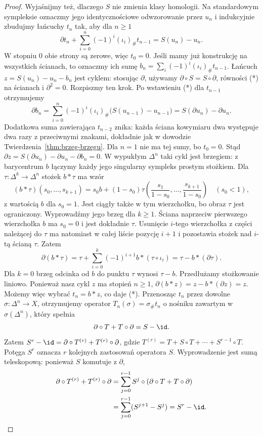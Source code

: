 \begin{proof}
Wyjaśnijmy też, dlaczego $S$ nie zmienia
klasy homologii. Na standardowym sympleksie
oznaczmy jego identycznościowe odwzorowanie
przez $u_n$ i indukcyjnie zbudujmy
łańcuchy $t_n$ tak, aby dla $n\geq1$
\[
 \partial t_n+\sum_{i=0}^n(-1)^i(\iota_i)_\#t_{n-1}
       =S(u_n)-u_n. \tag{*}
\]
W stopniu $0$ obie strony są zerowe,
więc $t_0=0$. Jeśli mamy już konstrukcję
na wszystkich ścianach, to oznaczmy ich sumę
$b_n=\sum_i(-1)^i(\iota_i)_\#t_{n-1}$.
Łańcuch $z=S(u_n)-u_n-b_n$
jest cyklem: stosując $\partial$,
używamy $\partial\circ S=S\circ\partial$,
równości (*) na ścianach
i $\partial^2=0$.
Rozpiszmy ten krok. Po wstawieniu (*) dla $t_{n-1}$
otrzymujemy
\[
 \partial b_n
 =\sum_{i=0}^n(-1)^i(\iota_i)_\#
       \bigl(S(u_{n-1})-u_{n-1}\bigr)
 =S(\partial u_n)-\partial u_n.
\]
Dodatkowa suma zawierająca $t_{n-2}$ znika:
każda ściana kowymiaru dwa występuje dwa razy
z przeciwnymi znakami, dokładnie jak w dowodzie
Twierdzenia~\ref{thm:brzeg-brzegu}. Dla $n=1$ nie ma tej sumy,
bo $t_0=0$. Stąd
$\partial z=S(\partial u_n)-\partial u_n-\partial b_n=0$.
W wypukłym $\Delta^n$ taki cykl jest
brzegiem: z barycentrum $b$ łączymy
każdy jego singularny sympleks prostym
stożkiem. Dla $\tau:\Delta^k\to\Delta^n$ stożek $b*\tau$
ma wzór
\[
 (b*\tau)(s_0,\ldots,s_{k+1})
 =s_0b+(1-s_0)\tau\left(\frac{s_1}{1-s_0},\ldots,
                         \frac{s_{k+1}}{1-s_0}\right)
 \quad(s_0<1),
\]
z wartością $b$ dla $s_0=1$. Jest ciągły także w tym wierzchołku,
bo obraz $\tau$ jest ograniczony.
Wyprowadźmy jego brzeg dla $k\geq1$. Ściana naprzeciw
pierwszego wierzchołka $b$ ma $s_0=0$ i jest dokładnie $\tau$.
Usunięcie $i$-tego wierzchołka z części należącej do $\tau$
ma natomiast w całej liście pozycję $i+1$
i pozostawia stożek nad $i$-tą ścianą $\tau$. Zatem
\[
 \partial(b*\tau)
 =\tau+\sum_{i=0}^k(-1)^{i+1}b*(\tau\circ\iota_i)
 =\tau-b*(\partial\tau).
\]
Dla $k=0$ brzeg odcinka od $b$ do punktu $\tau$
wynosi $\tau-b$. Przedłużamy stożkowanie liniowo.
Ponieważ nasz cykl $z$ ma stopień $n\geq1$,
$\partial(b*z)=z-b*(\partial z)=z$.
Możemy więc wybrać $t_n=b*z$, co daje (*).
Przenosząc $t_n$ przez dowolne
$\sigma:\Delta^n\to X$, otrzymujemy
operator $T_n(\sigma)=\sigma_\#t_n$ o nośniku zawartym
w $\sigma(\Delta^n)$, który spełnia
\[
 \partial\circ T+T\circ\partial=S-\id.
\]
Zatem $S^r-\id=\partial\circ T^{(r)}+
T^{(r)}\circ\partial$, gdzie
$T^{(r)}=T+S\circ T+\cdots+S^{r-1}\circ T$.
Potęga $S^r$ oznacza $r$ kolejnych zastosowań operatora $S$.
Wyprowadzenie jest sumą teleskopową: ponieważ $S$ komutuje z $\partial$,
\[
 \begin{aligned}
 \partial\circ T^{(r)}+T^{(r)}\circ\partial
 &=\sum_{j=0}^{r-1}S^j\circ(\partial\circ T+T\circ\partial)\\
 &=\sum_{j=0}^{r-1}(S^{j+1}-S^j)=S^r-\id.
 \end{aligned}
\]


\end{proof}
